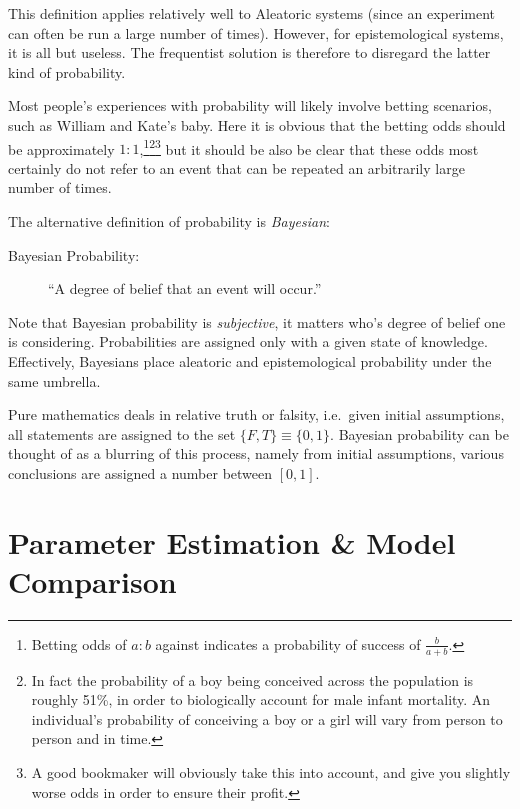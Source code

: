 This definition applies relatively well to Aleatoric systems (since an experiment can often be run a large number of times). However, for epistemological systems, it is all but useless. The frequentist solution is therefore to disregard the latter kind of probability.

Most people's experiences with probability will likely involve betting scenarios, such as William and Kate's baby. Here it is obvious that the betting odds should be approximately $1:1$,\footnote{Betting odds of $a:b$ against indicates a probability of success of $\frac{b}{a+b}$.}\footnote{In fact the probability of a boy being conceived across the population is roughly 51\%, in order to biologically account for male infant mortality. An individual's probability of conceiving a boy or a girl will vary from person to person and in time.}\footnote{A good bookmaker will obviously take this into account, and give you slightly worse odds in order to ensure their profit.} but it should be also be clear that these odds most certainly do not refer to an event that can be repeated an arbitrarily large number of times.

The alternative definition of probability is {\em Bayesian\/}:
\begin{description}
  \item[Bayesian Probability:] ``A degree of belief that an event will occur.'' 
\end{description}
Note that Bayesian probability is {\em subjective}, it matters who's degree of belief one is considering. Probabilities are assigned only with a given state of knowledge. Effectively, Bayesians place aleatoric and epistemological probability under the same umbrella. 

Pure mathematics deals in relative truth or falsity, i.e.\ given initial assumptions, all statements are assigned to the set $\{F,T\}\equiv\{0,1\}$. Bayesian probability can be thought of as a blurring of this process, namely from initial assumptions, various conclusions are assigned a number between $[0,1]$.

\section{Parameter Estimation \& Model Comparison}
\label{sec:bay:model_comp}

